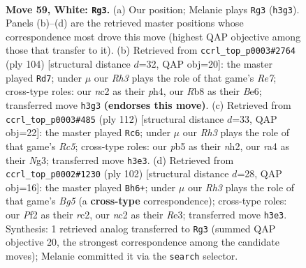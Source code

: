 \documentclass[11pt]{article}
\begin{document}
\clearpage

\begin{figure}[p]\centering
\begin{subfigure}{0.46\textwidth}\centering
\resizebox{\linewidth}{!}{%
\newchessgame
\chessboard[
  setfen={1R6/6k1/2r5/1p6/r3P1bB/7R/2n2P2/7K w - - 0 59},
  showmover=false,
  pgfstyle=straightmove, color=movearrow, markmove={h3-g3}
]}
\caption{}
\end{subfigure}\hfill
\begin{subfigure}{0.46\textwidth}\centering
\resizebox{\linewidth}{!}{%
\newchessgame
\chessboard[
  setfen={7k/4R3/3bB2p/3P4/4P2p/8/3r4/5K2 w - - 15 53},
  showmover=false,
  pgfstyle=straightmove, color=movearrow, markmove={e7-d7}
]}
\caption{}
\end{subfigure}
\\[4pt]
\begin{subfigure}{0.46\textwidth}\centering
\resizebox{\linewidth}{!}{%
\newchessgame
\chessboard[
  setfen={5k2/8/1b2r3/1PR1B3/6p1/6N1/7n/7K w - - 0 57},
  showmover=false,
  pgfstyle=straightmove, color=movearrow, markmove={c5-c6}
]}
\caption{}
\end{subfigure}\hfill
\begin{subfigure}{0.46\textwidth}\centering
\resizebox{\linewidth}{!}{%
\newchessgame
\chessboard[
  setfen={8/1p4k1/2nR4/5rB1/8/4R1KP/2r5/8 w - - 0 52},
  showmover=false,
  pgfstyle=straightmove, color=movearrow, markmove={g5-h6}
]}
\caption{}
\end{subfigure}
\caption{\textbf{Move 59, White: \texttt{Rg3}.} (a) Our position; Melanie plays \texttt{Rg3} (\texttt{h3g3}). Panels (b)--(d) are the retrieved master positions whose correspondence most drove this move (highest QAP objective among those that transfer to it). (b) Retrieved from \texttt{ccrl\_top\_p0003\#2764} (ply 104) [structural distance $d$=32, QAP obj=20]: the master played \texttt{Rd7}; under $\mu$ our \emph{Rh3} plays the role of that game's \emph{Re7}; cross-type roles: our \emph{n}c2 as their \emph{p}h4, our \emph{R}b8 as their \emph{B}e6; transferred move \texttt{h3g3} \textbf{(endorses this move)}. (c) Retrieved from \texttt{ccrl\_top\_p0003\#485} (ply 112) [structural distance $d$=33, QAP obj=22]: the master played \texttt{Rc6}; under $\mu$ our \emph{Rh3} plays the role of that game's \emph{Rc5}; cross-type roles: our \emph{p}b5 as their \emph{n}h2, our \emph{r}a4 as their \emph{N}g3; transferred move \texttt{h3e3}. (d) Retrieved from \texttt{ccrl\_top\_p0002\#1230} (ply 102) [structural distance $d$=28, QAP obj=16]: the master played \texttt{Bh6+}; under $\mu$ our \emph{Rh3} plays the role of that game's \emph{Bg5} (a \textbf{cross-type} correspondence); cross-type roles: our \emph{P}f2 as their \emph{r}c2, our \emph{n}c2 as their \emph{R}e3; transferred move \texttt{h3e3}. Synthesis: 1 retrieved analog transferred to \texttt{Rg3} (summed QAP objective 20, the strongest correspondence among the candidate moves); Melanie committed it via the \texttt{search} selector.}
\label{fig:thought-m116}
\end{figure}
\end{document}
